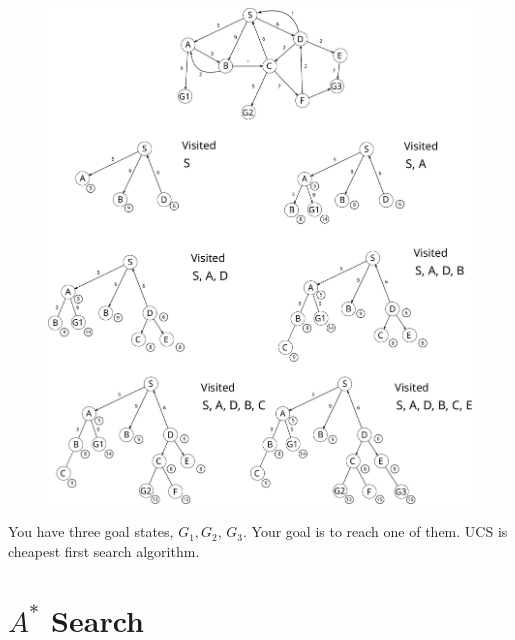 \begin{figure}[h]
	\centering
	\includegraphics[scale=0.4]{./images/search_alg/uniform_cost_search.pdf}
\end{figure}

You have three goal states, $G_1, G_2$, $G_3$. Your goal is to reach one of them. UCS is cheapest first search algorithm.

\section{$A^*$ Search}

